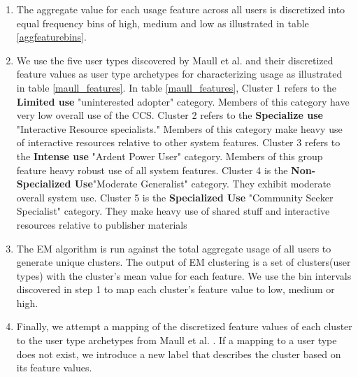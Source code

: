 \documentclass{acm_proc_article-sp}
\begin{document}
\begin{enumerate}
\item The aggregate value for each usage feature across all users is discretized into equal frequency bins of high, medium and low as illustrated in table \ref{aggfeaturebins}.

\item We use the five user types discovered by Maull et al. \cite{maullunderstanding} and their discretized feature values as user type archetypes for characterizing usage as illustrated in table \ref{maull_features}. In table \ref{maull_features}, Cluster 1 refers to the \textbf{Limited use} "uninterested adopter" category. Members of this category have very low overall use of the CCS. Cluster 2 refers to the \textbf{Specialize use} "Interactive Resource specialists." Members of this category make heavy use of interactive resources relative to other system features. Cluster 3 refers to the \textbf{Intense use} "Ardent Power User" category. Members of this group feature heavy robust use of all system features. Cluster 4 is the \textbf{Non-Specialized Use}"Moderate Generalist" category. They exhibit moderate overall system use. Cluster 5 is the \textbf{Specialized Use} "Community Seeker Specialist" category. They make heavy use of shared stuff and interactive resources relative to publisher materials

\item The EM algorithm is run against the total aggregate usage of all users to generate unique clusters. The output of EM clustering is a set of clusters(user types) with the cluster's mean value for each feature. We use the bin intervals discovered in step 1 to map each cluster's feature value to low, medium or high.

\item Finally, we attempt a mapping of the discretized feature values of each cluster to the user type archetypes from Maull et al. \cite{maullunderstanding}. If a mapping to a user type does not exist, we introduce a new label that describes the cluster based on its feature values.


\end{enumerate}
\end{document}
